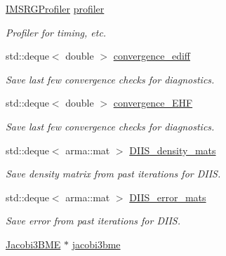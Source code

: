 \begin{DoxyCompactItemize}
\item 
\hypertarget{classHartreeFock_a0435b3f1485ddd1d8d91bbd84e008445}{\hyperlink{classIMSRGProfiler}{I\-M\-S\-R\-G\-Profiler} \hyperlink{classHartreeFock_a0435b3f1485ddd1d8d91bbd84e008445}{profiler}}\label{classHartreeFock_a0435b3f1485ddd1d8d91bbd84e008445}

\begin{DoxyCompactList}\small\item\em Profiler for timing, etc. \end{DoxyCompactList}\item 
\hypertarget{classHartreeFock_a42d87e7ce2ad6e56d12063a62ff91bf9}{std\-::deque$<$ double $>$ \hyperlink{classHartreeFock_a42d87e7ce2ad6e56d12063a62ff91bf9}{convergence\-\_\-ediff}}\label{classHartreeFock_a42d87e7ce2ad6e56d12063a62ff91bf9}

\begin{DoxyCompactList}\small\item\em Save last few convergence checks for diagnostics. \end{DoxyCompactList}\item 
\hypertarget{classHartreeFock_ac1366b8f034fb0feb9aed43480398f54}{std\-::deque$<$ double $>$ \hyperlink{classHartreeFock_ac1366b8f034fb0feb9aed43480398f54}{convergence\-\_\-\-E\-H\-F}}\label{classHartreeFock_ac1366b8f034fb0feb9aed43480398f54}

\begin{DoxyCompactList}\small\item\em Save last few convergence checks for diagnostics. \end{DoxyCompactList}\item 
\hypertarget{classHartreeFock_af01bb74d202e6f5918bc8ec5ce36c306}{std\-::deque$<$ arma\-::mat $>$ \hyperlink{classHartreeFock_af01bb74d202e6f5918bc8ec5ce36c306}{D\-I\-I\-S\-\_\-density\-\_\-mats}}\label{classHartreeFock_af01bb74d202e6f5918bc8ec5ce36c306}

\begin{DoxyCompactList}\small\item\em Save density matrix from past iterations for D\-I\-I\-S. \end{DoxyCompactList}\item 
\hypertarget{classHartreeFock_ae8056ec7194c14d20693f7c43f4a10ce}{std\-::deque$<$ arma\-::mat $>$ \hyperlink{classHartreeFock_ae8056ec7194c14d20693f7c43f4a10ce}{D\-I\-I\-S\-\_\-error\-\_\-mats}}\label{classHartreeFock_ae8056ec7194c14d20693f7c43f4a10ce}

\begin{DoxyCompactList}\small\item\em Save error from past iterations for D\-I\-I\-S. \end{DoxyCompactList}\item 
\hypertarget{classHartreeFock_a11c6d05093805dee7e8364fd02fc302f}{\hyperlink{classJacobi3BME}{Jacobi3\-B\-M\-E} $\ast$ \hyperlink{classHartreeFock_a11c6d05093805dee7e8364fd02fc302f}{jacobi3bme}}\label{classHartreeFock_a11c6d05093805dee7e8364fd02fc302f}


\end{DoxyCompactItemize}

